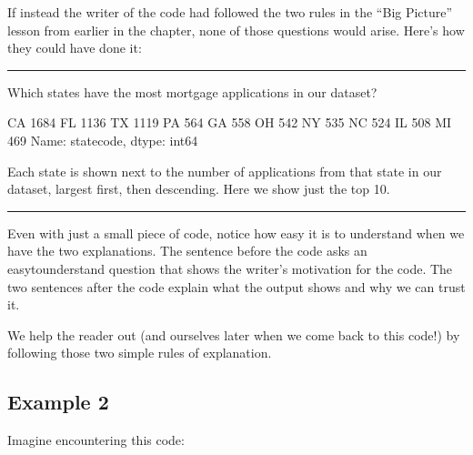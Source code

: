 \documentclass[letterpaper,10pt,english]{sphinxmanual}
\begin{document}
If instead the writer of the code had followed the two rules in the “Big Picture” lesson from earlier in the chapter, none of those questions would arise.  Here’s how they could have done it:


\bigskip\hrule\bigskip


Which states have the most mortgage applications in our dataset?

\begin{sphinxVerbatim}[commandchars=\\\{\}]
\PYG{p}{[}\PYG{p}{]}  
\end{sphinxVerbatim}

\begin{sphinxVerbatim}[commandchars=\\\{\}]
CA    1684
FL    1136
TX    1119
PA     564
GA     558
OH     542
NY     535
NC     524
IL     508
MI     469
Name: state\PYGZus{}code, dtype: int64
\end{sphinxVerbatim}

Each state is shown next to the number of applications from that state in our dataset, largest first, then descending.  Here we show just the top 10.


\bigskip\hrule\bigskip


Even with just a small piece of code, notice how easy it is to understand when we have the two explanations.  The sentence before the code asks an easy\sphinxhyphen{}to\sphinxhyphen{}understand question that shows the writer’s motivation for the code.  The two sentences after the code explain what the output shows and why we can trust it.

We help the reader out (and ourselves later when we come back to this code!) by following those two simple rules of explanation.


\subsection{Example 2}
\label{\detokenize{chapter-5-before-and-after:example-2}}
Imagine encountering this code:

\begin{sphinxVerbatim}[commandchars=\\\{\}]
  \PYG{p}{[}\PYG{p}{]}
\end{sphinxVerbatim}
\end{document}
